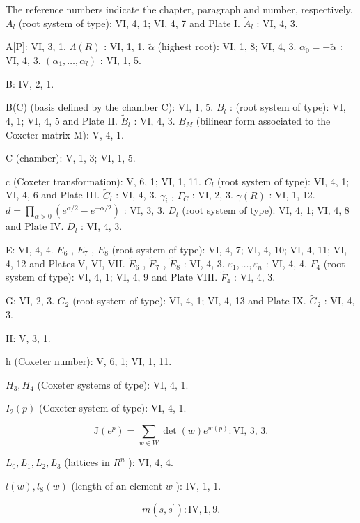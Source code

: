 
The reference numbers indicate the chapter, paragraph and number, respectively. \(A_{l}\) (root system of type): VI, 4, 1; VI, 4, 7 and Plate I. \(\tilde{A}_{l}\) : VI, 4, 3.

A{[}P{]}: VI, 3, 1. \(\Lambda(R)\) : VI, 1, 1. \(\tilde{\alpha}\) (highest root): VI, 1, 8; VI, 4, 3. \(\alpha_{0} = -\tilde{\alpha}\) : VI, 4, 3. \((\alpha_{1}, \ldots, \alpha_{l})\) : VI, 1, 5.

B: IV, 2, 1.

B(C) (basis defined by the chamber C): VI, 1, 5. \(B_{l}\) : (root system of type): VI, 4, 1; VI, 4, 5 and Plate II. \(\tilde{B}_{l}\) : VI, 4, 3. \(B_{M}\) (bilinear form associated to the Coxeter matrix M): V, 4, 1.

C (chamber): V, 1, 3; VI, 1, 5.

c (Coxeter transformation): V, 6, 1; VI, 1, 11. \(C_{l}\) (root system of type): VI, 4, 1; VI, 4, 6 and Plate III. \(\tilde{C}_{l}\) : VI, 4, 3. \(\gamma_{i}\) , \(\Gamma_{C}\) : VI, 2, 3. \(\gamma(R)\) : VI, 1, 12. \(d = \prod_{\alpha > 0} (e^{\alpha/2} - e^{-\alpha/2})\) : VI, 3, 3. \(D_{l}\) (root system of type): VI, 4, 1; VI, 4, 8 and Plate IV. \(\tilde{D}_{l}\) : VI, 4, 3.

E: VI, 4, 4. \(E_{6}\) , \(E_{7}\) , \(E_{8}\) (root system of type): VI, 4, 7; VI, 4, 10; VI, 4, 11; VI, 4, 12 and Plates V, VI, VII. \(\tilde{E}_{6}\) , \(\tilde{E}_{7}\) , \(\tilde{E}_{8}\) : VI, 4, 3. \(\varepsilon_{1}, \ldots, \varepsilon_{n}\) : VI, 4, 4. \(F_{4}\) (root system of type): VI, 4, 1; VI, 4, 9 and Plate VIII. \(\tilde{F}_{4}\) : VI, 4, 3.

G: VI, 2, 3. \(G_{2}\) (root system of type): VI, 4, 1; VI, 4, 13 and Plate IX. \(\tilde{G}_{2}\) : VI, 4, 3.

H: V, 3, 1.

h (Coxeter number): V, 6, 1; VI, 1, 11.

\(H_{3}, H_{4}\) (Coxeter systems of type): VI, 4, 1.

\(I_{2}(p)\) (Coxeter system of type): VI, 4, 1.

\[
\mathrm{J} (e ^ {p}) = \sum_ {w \in W} \det (w) e ^ {w (p)}: \text {VI, 3, 3.}
\]

\(L_{0}, L_{1}, L_{2}, L_{3}\) (lattices in \(R^{n}\) ): VI, 4, 4.

\(l(w), l_{\mathrm{S}}(w)\) (length of an element \(w\) ): IV, 1, 1.

\[
m (s, s ^ {\prime}): \mathrm{IV}, 1, 9.
\]

